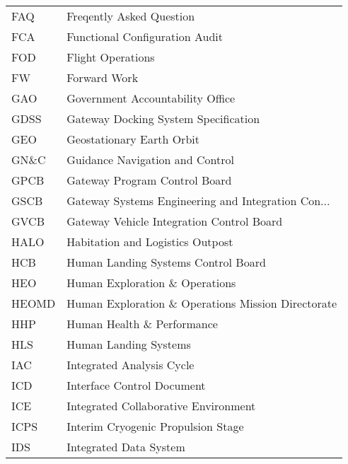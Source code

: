 \begin{longtable}{ll}
   FAQ &                           Freqently Asked Question \\  
 
   FCA &                     Functional Configuration Audit \\  
 
   FOD &                                  Flight Operations \\  
 
    FW &                                       Forward Work \\  
 
   GAO &                   Government Accountability Office \\  
 
  GDSS &               Gateway Docking System Specification \\  
 
   GEO &                          Geostationary Earth Orbit \\  
 
  GN\&C &                    Guidance Navigation and Control \\  
 
  GPCB &                      Gateway Program Control Board \\  
 
  GSCB & Gateway Systems Engineering and Integration Con... \\  
 
  GVCB &          Gateway Vehicle Integration Control Board \\  
 
  HALO &                   Habitation and Logistics Outpost \\  
 
   HCB &                Human Landing Systems Control Board \\  
 
   HEO &                     Human Exploration \& Operations \\  
 
 HEOMD & Human Exploration \& Operations Mission Directorate \\  
 
   HHP &                         Human Health \& Performance \\  
 
   HLS &                              Human Landing Systems \\  
 
   IAC &                          Integrated Analysis Cycle \\  
 
   ICD &                         Interface Control Document \\  
 
   ICE &               Integrated Collaborative Environment \\  
 
  ICPS &                 Interim Cryogenic Propulsion Stage \\  
 
   IDS &                             Integrated Data System \\  
 
\end{longtable}
